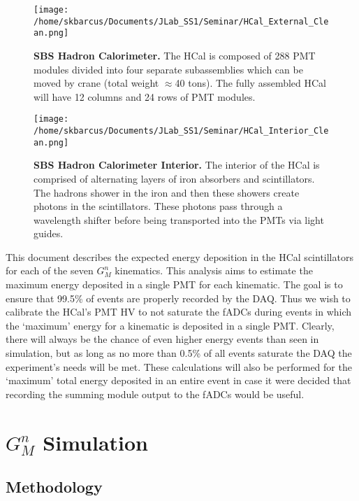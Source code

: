 \documentclass[10pt]{article}
\begin{document}
	\begin{figure}[!ht]
	\begin{center}
	\texttt{[image: /home/skbarcus/Documents/JLab\_SS1/Seminar/HCal\_External\_Clean.png]}
	\end{center}
	\caption{
	{\bf{SBS Hadron Calorimeter.}} The HCal is composed of 288 PMT modules divided into four separate subassemblies which can be moved by crane (total weight $\approx$40 tons). The fully assembled HCal will have 12 columns and 24 rows of PMT modules. }
	\label{fig:HCal}
	\end{figure}	
	
	\begin{figure}[!ht]
	\begin{center}
	\texttt{[image: /home/skbarcus/Documents/JLab\_SS1/Seminar/HCal\_Interior\_Clean.png]}
	\end{center}
	\caption{
	{\bf{SBS Hadron Calorimeter Interior.}} The interior of the HCal is comprised of alternating layers of iron absorbers and scintillators. The hadrons shower in the iron and then these showers create photons in the scintillators. These photons pass through a wavelength shifter before being transported into the PMTs via light guides.}
	\label{fig:HCal_interior}
	\end{figure}	

This document describes the expected energy deposition in the HCal scintillators for each of the seven $G_M^n$ kinematics. This analysis aims to estimate the maximum energy deposited in a single PMT for each kinematic. The goal is to ensure that 99.5\% of events are properly recorded by the DAQ. Thus we wish to calibrate the HCal's PMT HV to not saturate the fADCs during events in which the `maximum' energy for a kinematic is deposited in a single PMT. Clearly, there will always be the chance of even higher energy events than seen in simulation, but as long as no more than 0.5\% of all events saturate the DAQ the experiment's needs will be met. These calculations will also be performed for the `maximum' total energy deposited in an entire event in case it were decided that recording the summing module output to the fADCs would be useful.\\

\section{$G_M^n$ Simulation}
\subsection{Methodology}
\end{document}
